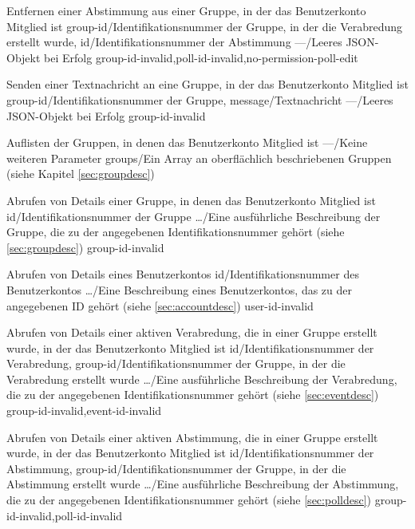 \documentclass[parskip=full,11pt]{scrartcl}
\begin{document}
{Entfernen einer Abstimmung aus einer Gruppe, in der das Benutzerkonto Mitglied
ist}
{group-id/Identifikationsnummer der Gruppe{,} in der die Verabredung erstellt
wurde,
id/Identifikationsnummer der Abstimmung}
{---/Leeres JSON-Objekt bei Erfolg}
{group-id-invalid,poll-id-invalid,no-permission-poll-edit}

{Senden einer Textnachricht an eine Gruppe, in der das Benutzerkonto Mitglied
ist}
{group-id/Identifikationsnummer der Gruppe,
message/Textnachricht} %
{---/Leeres JSON-Objekt bei Erfolg}
{group-id-invalid}

{Auflisten der Gruppen, in denen das Benutzerkonto Mitglied ist}
{---/Keine weiteren Parameter}
{groups/Ein Array an oberflächlich beschriebenen Gruppen (siehe
Kapitel \ref{sec:groupdesc})}
{}

{Abrufen von Details einer Gruppe, in denen das Benutzerkonto Mitglied ist}
{id/Identifikationsnummer der Gruppe}
{\dots/Eine ausführliche Beschreibung der Gruppe{,} die zu der angegebenen
Identifikationsnummer gehört (siehe \ref{sec:groupdesc})}
{group-id-invalid}

{Abrufen von Details eines Benutzerkontos}
{id/Identifikationsnummer des Benutzerkontos}
{\dots/Eine Beschreibung eines Benutzerkontos{,} das zu der angegebenen
ID gehört (siehe \ref{sec:accountdesc})}
{user-id-invalid}

{Abrufen von Details einer aktiven Verabredung, die in einer Gruppe erstellt
wurde, in der das Benutzerkonto Mitglied ist}
{id/Identifikationsnummer der Verabredung,
group-id/Identifikationsnummer der Gruppe{,} in der die Verabredung erstellt
wurde}
{\dots/Eine ausführliche Beschreibung der Verabredung{,} die zu der angegebenen
Identifikationsnummer gehört (siehe \ref{sec:eventdesc})}
{group-id-invalid,event-id-invalid}

{Abrufen von Details einer aktiven Abstimmung, die in einer Gruppe erstellt
wurde, in der das Benutzerkonto Mitglied ist}
{id/Identifikationsnummer der Abstimmung,
group-id/Identifikationsnummer der Gruppe{,} in der die Abstimmung erstellt
wurde}
{\dots/Eine ausführliche Beschreibung der Abstimmung{,} die zu der angegebenen
Identifikationsnummer gehört (siehe \ref{sec:polldesc})}
{group-id-invalid,poll-id-invalid}
\end{document}
